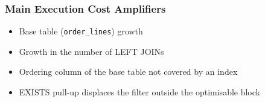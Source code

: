 \documentclass{beamer}
\begin{document}
\begin{frame}\frametitle{Main Execution Cost Amplifiers}
\begin{itemize}
  \item Base table (\texttt{order\_lines}) growth
  \item Growth in the number of LEFT JOINs
  \item Ordering column of the base table not covered by an index
  \item EXISTS pull-up displaces the filter outside the optimisable block
\end{itemize}
\end{frame}

%
%
%
%
%
%
%
%
%
\end{document}
